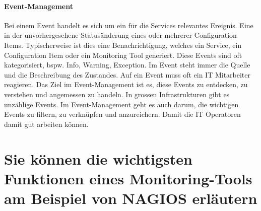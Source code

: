 \paragraph{Event-Management}
Bei einem Event handelt es sich um ein für die Services relevantes Ereignis. Eine in der unvorhergesehene Statusänderung eines oder mehrerer Configuration Items. Typischerweise ist dies eine Benachrichtigung, welches ein Service, ein Configuration Item oder ein Monitoring Tool generiert. Diese Events sind oft kategorisiert, bspw. Info, Warning, Exception. Im Event steht immer die Quelle und die Beschreibung des Zustandes. Auf ein Event muss oft ein IT Mitarbeiter reagieren. Das Ziel im Event-Management ist es, diese Events zu entdecken, zu verstehen und angemessen zu handeln.
In grossen Infrastrukturen gibt es unzählige Events. Im Event-Management geht es auch darum, die wichtigen Events zu filtern, zu verknüpfen und anzureichern. Damit die IT Operatoren damit gut arbeiten können.

\section{Sie können die wichtigsten Funktionen eines Monitoring-Tools am Beispiel von NAGIOS erläutern}

